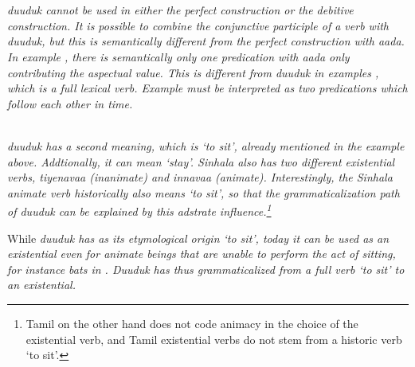  \\

 \\ 
\em duuduk \em cannot be used in either the perfect construction or the debitive construction. It is possible to combine the conjunctive participle of a verb with \em duuduk\em, but this is semantically different from the perfect construction with \em aada\em. In example , there is semantically only one predication with \em aada \em only contributing the aspectual value. This is different from \em duuduk \em in  examples , which is a full lexical verb. Example  must be interpreted as two predications which follow each other in time.



 \\
 \em duuduk \em has a second meaning, which is `to sit', already mentioned in the example above.
Addtionally, it can  mean `stay'. Sinhala also has two different existential verbs, \em tiyenavaa \em (inanimate) and \em innavaa \em (animate). Interestingly, the Sinhala animate verb historically also means `to sit', so that the grammaticalization path of \em duuduk \em can be explained by this adstrate influence.\footnote{Tamil on the other hand does not code animacy in the choice of the existential verb, and Tamil existential verbs do not stem from a historic verb `to sit'.}

While \em duuduk \em has as its etymological origin `to sit', today it can be used as an existential even for animate beings that are unable to perform the act of sitting, for instance bats in . \em Duuduk \em has thus grammaticalized from a full verb `to sit' to an existential.


